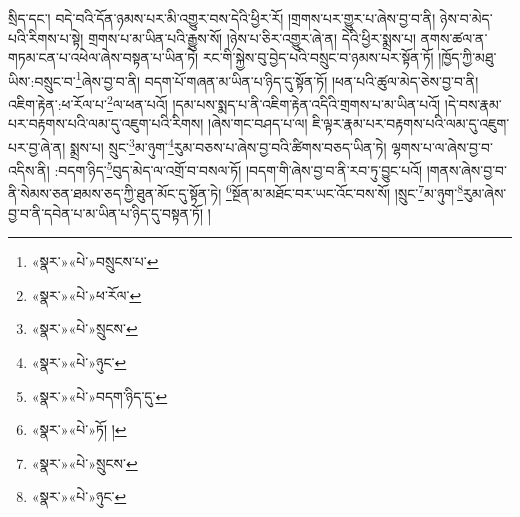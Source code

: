 སྲིད་དང་། བདེ་བའི་དོན་ཉམས་པར་མི་འགྱུར་བས་དེའི་ཕྱིར་རོ། །གྲགས་པར་གྱུར་པ་ཞེས་བྱ་བ་ནི། ཉེས་བ་མེད་པའི་རིགས་པ་སྟེ། གྲགས་པ་མ་ཡིན་པའི་རྒྱུས་སོ། །ཉེས་པ་ཅིར་འགྱུར་ཞེ་ན། དེའི་ཕྱིར་སྨྲས་པ། ནགས་ཚལ་ན་གཏམ་ངན་པ་འཕེལ་ཞེས་བསྟན་པ་ཡིན་ཏེ། རང་གི་སྐྱེས་བུ་བྱེད་པའི་བསྲུང་བ་ཉམས་པར་སྟོན་ཏོ། །ཁྱོད་ཀྱི་མཐུ་ཡིས་:བསྲུང་བ་\footnote{«སྣར་»«པེ་»བསྲུངས་པ་}ཞེས་བྱ་བ་ནི། བདག་པོ་གཞན་མ་ཡིན་པ་ཉིད་དུ་སྟོན་ཏོ། །ཕན་པའི་ཚུལ་མེད་ཅེས་བྱ་བ་ནི། འཇིག་རྟེན་:ཕ་རོལ་པ་\footnote{«སྣར་»«པེ་»ཕ་རོལ་}ལ་ཕན་པའོ། །དམ་པས་སྨད་པ་ནི་འཇིག་རྟེན་འདིའི་གྲགས་པ་མ་ཡིན་པའོ། །དེ་བས་རྣམ་པར་བརྟགས་པའི་ལམ་དུ་འཇུག་པའི་རིགས། །ཞེས་གང་བཤད་པ་ལ། ཇི་ལྟར་རྣམ་པར་བརྟགས་པའི་ལམ་དུ་འཇུག་པར་བྱ་ཞེ་ན། སྨྲས་པ། སྲུང་\footnote{«སྣར་»«པེ་»སྲུངས་}མ་ཉུག་\footnote{«སྣར་»«པེ་»ཉུང་}རུམ་བཅས་པ་ཞེས་བྱ་བའི་ཚིགས་བཅད་ཡིན་ཏེ། ལྷགས་པ་ལ་ཞེས་བྱ་བ་འདིས་ནི། :བདག་ཉིད་\footnote{«སྣར་»«པེ་»བདག་ཉིད་དུ་}བུད་མེད་ལ་འགྲོ་བ་བསལ་ཏོ། །བདག་གི་ཞེས་བྱ་བ་ནི་རབ་ཏུ་བྱུང་པའོ། །གནས་ཞེས་བྱ་བ་ནི་སེམས་ཅན་ཐམས་ཅད་ཀྱི་ཐུན་མོང་དུ་སྟོན་ཏེ། \footnote{«སྣར་»«པེ་»ཏོ། ། }སྔོན་མ་མཐོང་བར་ཡང་འོང་བས་སོ། །སྲུང་\footnote{«སྣར་»«པེ་»སྲུངས་}མ་ཉུག་\footnote{«སྣར་»«པེ་»ཉུང་}རུམ་ཞེས་བྱ་བ་ནི་དབེན་པ་མ་ཡིན་པ་ཉིད་དུ་བསྟན་ཏོ། །
